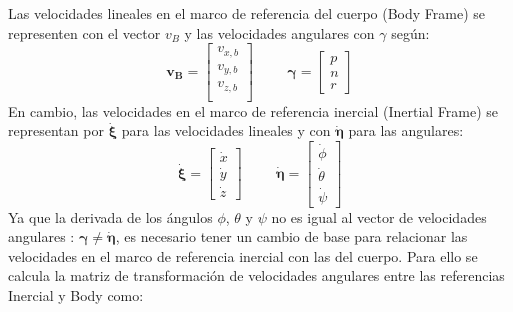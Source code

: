 \documentclass[twoside,11pt]{book}
\begin{document}
Las velocidades lineales en el marco de referencia del cuerpo (Body Frame) se representen con el vector $v_B$ y las velocidades angulares con $\gamma$ según:
\begin{equation}
\pmb{v_B}=\left[\begin{array}{c}
v_{x,b}\\
v_{y,b}\\
v_{z,b}\\
\end{array}\right] \hspace{1cm} \pmb{\gamma}=\left[\begin{array}{c}
p\\
n\\
r
\end{array} \right]
\end{equation}
En cambio, las velocidades en el marco de referencia inercial (Inertial Frame)  se representan por $\pmb{\dot{\xi}}$ para las velocidades lineales y con $\pmb{\dot{\eta}}$ para las angulares: 
\begin{equation}
\pmb{\dot{\xi}}=\left[\begin{array}{c}
\dot{x} \\
\dot{y} \\
\dot{z}
\end{array} \right] \hspace{1cm} \pmb{\dot{\eta}}=\left[\begin{array}{c}
\dot{\phi} \\
\dot{\theta} \\
\dot{\psi}
\end{array} \right] 
\end{equation}
Ya que la derivada de los ángulos $\phi$, $\theta$ y $\psi$ no es igual al vector de velocidades angulares : $\pmb{\gamma} \neq \pmb{\dot{\eta}}$, es necesario tener un cambio de base para relacionar las velocidades en el marco de referencia inercial con las del cuerpo. Para ello se calcula la matriz de transformación de velocidades angulares entre las referencias Inercial y Body como:
\end{document}

